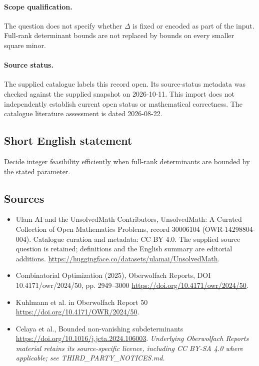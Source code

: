 \documentclass[11pt]{article}
\begin{document}
\paragraph{Scope qualification.}
The question does not specify whether $\Delta$ is fixed or encoded as part of the input. Full-rank determinant bounds are not replaced by bounds on every smaller square minor.
\paragraph{Source status.}
The supplied catalogue labels this record open. Its source-status metadata was checked against the supplied snapshot on 2026-10-11. This import does not independently establish current open status or mathematical correctness. The catalogue literature assessment is dated 2026-08-22.
\subsection{Short English statement}
Decide integer feasibility efficiently when full-rank determinants are bounded by the stated parameter.
\subsection{Sources}
\begin{itemize}
\item[S1] Ulam AI and the UnsolvedMath Contributors, UnsolvedMath: A Curated Collection of Open Mathematics Problems, record 30006104 (OWR-14298804-004). Catalogue curation and metadata: CC BY 4.0. The supplied source question is retained; definitions and the English summary are editorial additions.
\url{https://huggingface.co/datasets/ulamai/UnsolvedMath}.
\item[S2] Combinatorial Optimization (2025), Oberwolfach Reports, DOI 10.4171/owr/2024/50, pp. 2949--3000
\url{https://doi.org/10.4171/owr/2024/50}.
\item[S3] Kuhlmann et al. in Oberwolfach Report 50
\url{https://doi.org/10.4171/OWR/2024/50}.
\item[S4] Celaya et al., Bounded non-vanishing subdeterminants
\url{https://doi.org/10.1016/j.jcta.2024.106003}.
\textit{Underlying Oberwolfach Reports material retains its source-specific licence, including CC BY-SA 4.0 where applicable; see THIRD\_PARTY\_NOTICES.md.}
\end{itemize}
\end{document}
